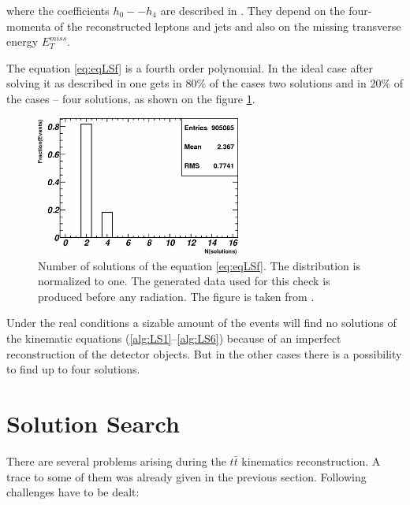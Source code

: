 where the coefficients $h_{0} -- h_{4}$ are described in \cite{LSpaper, LSerrat}. They depend on the four-momenta of the reconstructed 
leptons and jets and also on the missing transverse energy $E_{T}^{miss}$. 

The equation \ref{eq:eqLSf} is a fourth order polynomial. In the ideal case after solving it as described in \cite{LSpaper} one gets
in 80$\%$ of the cases two solutions and in 20$\%$ of the cases -- four solutions, as shown on the figure \ref{fig:LSNsol}.

\begin{figure}[t]
  \centering
  \includegraphics[width=0.6\textwidth]{05_kinReco/plots/medium.png}
  \caption{Number of solutions of the equation \ref{eq:eqLSf}. The distribution is normalized to one. The generated data used for this check
  is produced before any radiation. The figure is taken from \cite{LSpaper}.}
  \label{fig:LSNsol}
\end{figure}

Under the real conditions a sizable amount of the events will find no solutions of the kinematic equations (\ref{alg:LS1}--\ref{alg:LS6})
because of an imperfect reconstruction of the detector objects. But in the other cases there is a possibility to find up to four solutions.

\section{Solution Search}\label{sec:SolSer}

There are several problems arising during the $t\bar{t}$ kinematics reconstruction. A trace to some of them was already given in the previous
section. Following challenges have to be dealt:

